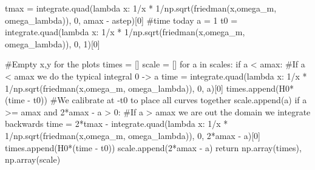 \documentclass[
  letterpaper,
  DIV=11,
  numbers=noendperiod]{scrreprt}
\newenvironment{Shaded}{\begin{snugshade}}{\end{snugshade}}
\newcommand{\CommentTok}[1]{\textcolor[rgb]{0.37,0.37,0.37}{#1}}
\newcommand{\ControlFlowTok}[1]{\textcolor[rgb]{0.00,0.23,0.31}{#1}}
\newcommand{\DecValTok}[1]{\textcolor[rgb]{0.68,0.00,0.00}{#1}}
\newcommand{\KeywordTok}[1]{\textcolor[rgb]{0.00,0.23,0.31}{#1}}
\newcommand{\NormalTok}[1]{\textcolor[rgb]{0.00,0.23,0.31}{#1}}
\newcommand{\OperatorTok}[1]{\textcolor[rgb]{0.37,0.37,0.37}{#1}}
\begin{document}
\begin{tcolorbox}[enhanced jigsaw, toprule=.15mm, colframe=quarto-callout-color-frame, bottomrule=.15mm, leftrule=.75mm, left=2mm, breakable, rightrule=.15mm, arc=.35mm, opacityback=0, colback=white]
\begin{Shaded}
\begin{Highlighting}[]
\NormalTok{    tmax }\OperatorTok{=}\NormalTok{ integrate.quad(}\KeywordTok{lambda}\NormalTok{ x: }\DecValTok{1}\OperatorTok{/}\NormalTok{x }\OperatorTok{*} \DecValTok{1}\OperatorTok{/}\NormalTok{np.sqrt(friedman(x,omega\_m, omega\_lambda)), }\DecValTok{0}\NormalTok{, amax }\OperatorTok{{-}}\NormalTok{ astep)[}\DecValTok{0}\NormalTok{]}
    \CommentTok{\#time today a = 1}
\NormalTok{    t0 }\OperatorTok{=}\NormalTok{ integrate.quad(}\KeywordTok{lambda}\NormalTok{ x: }\DecValTok{1}\OperatorTok{/}\NormalTok{x }\OperatorTok{*} \DecValTok{1}\OperatorTok{/}\NormalTok{np.sqrt(friedman(x,omega\_m, omega\_lambda)), }\DecValTok{0}\NormalTok{, }\DecValTok{1}\NormalTok{)[}\DecValTok{0}\NormalTok{]}

    \CommentTok{\#Empty x,y for the plots}
\NormalTok{    times }\OperatorTok{=}\NormalTok{ []}
\NormalTok{    scale }\OperatorTok{=}\NormalTok{ []}
    \ControlFlowTok{for}\NormalTok{ a }\KeywordTok{in}\NormalTok{ scales:}
        \ControlFlowTok{if}\NormalTok{ a }\OperatorTok{\textless{}}\NormalTok{ amax: }\CommentTok{\#If a \textless{} amax we do the typical integral 0 {-}\textgreater{} a}
\NormalTok{            time }\OperatorTok{=}\NormalTok{ integrate.quad(}\KeywordTok{lambda}\NormalTok{ x: }\DecValTok{1}\OperatorTok{/}\NormalTok{x }\OperatorTok{*} \DecValTok{1}\OperatorTok{/}\NormalTok{np.sqrt(friedman(x,omega\_m, omega\_lambda)), }\DecValTok{0}\NormalTok{, a)[}\DecValTok{0}\NormalTok{]}
\NormalTok{            times.append(H0}\OperatorTok{*}\NormalTok{(time }\OperatorTok{{-}}\NormalTok{ t0)) }\CommentTok{\#We calibrate at {-}t0 to place all curves together}
\NormalTok{            scale.append(a)}
        \ControlFlowTok{if}\NormalTok{ a }\OperatorTok{\textgreater{}=}\NormalTok{ amax }\KeywordTok{and} \DecValTok{2}\OperatorTok{*}\NormalTok{amax }\OperatorTok{{-}}\NormalTok{ a }\OperatorTok{\textgreater{}} \DecValTok{0}\NormalTok{: }\CommentTok{\#If a \textgreater{} amax we are out the domain we integrate backwards}
\NormalTok{            time }\OperatorTok{=} \DecValTok{2}\OperatorTok{*}\NormalTok{tmax }\OperatorTok{{-}}\NormalTok{ integrate.quad(}\KeywordTok{lambda}\NormalTok{ x: }\DecValTok{1}\OperatorTok{/}\NormalTok{x }\OperatorTok{*} \DecValTok{1}\OperatorTok{/}\NormalTok{np.sqrt(friedman(x,omega\_m, omega\_lambda)), }\DecValTok{0}\NormalTok{, }\DecValTok{2}\OperatorTok{*}\NormalTok{amax }\OperatorTok{{-}}\NormalTok{ a)[}\DecValTok{0}\NormalTok{]}
\NormalTok{            times.append(H0}\OperatorTok{*}\NormalTok{(time }\OperatorTok{{-}}\NormalTok{ t0))}
\NormalTok{            scale.append(}\DecValTok{2}\OperatorTok{*}\NormalTok{amax }\OperatorTok{{-}}\NormalTok{ a)}
    \ControlFlowTok{return}\NormalTok{ np.array(times), np.array(scale)}


\end{Highlighting}
\end{Shaded}
\end{tcolorbox}
\end{document}
